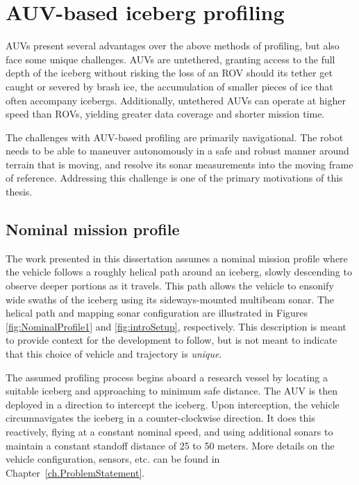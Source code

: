 \section{AUV-based iceberg profiling}

AUVs present several advantages over the above methods of profiling, but also face some unique challenges. AUVs are untethered, granting access to the full depth of the iceberg without risking the loss of an ROV should its tether get caught or severed by brash ice, the accumulation of smaller pieces of ice that often accompany icebergs. Additionally, untethered AUVs can operate at higher speed than ROVs, yielding greater data coverage and shorter mission  time. 

The challenges with AUV-based profiling are primarily navigational. The robot needs to be able to maneuver autonomously in a safe and robust manner around terrain that is moving, and resolve its sonar measurements into the moving frame of reference. Addressing this challenge is one of the primary motivations of this thesis.



\subsection{Nominal mission profile}
\label{sec.MissionProfileDef}
The work presented in this dissertation assumes a nominal mission profile where the vehicle follows a roughly helical path around an iceberg, slowly descending to observe deeper portions as it travels. This path allows the vehicle to ensonify wide swaths of the iceberg using its sideways-mounted multibeam sonar. The helical path and mapping sonar configuration are illustrated in Figures \ref{fig:NominalProfile1} and \ref{fig:introSetup}, respectively. This description is meant to provide context for the development to follow, but is not meant to indicate that this choice of vehicle and trajectory is \emph{unique}.  

The assumed profiling process begins aboard a research vessel by locating a suitable iceberg and approaching to minimum safe distance. The AUV is then deployed in a direction to intercept the iceberg. Upon interception, the vehicle circumnavigates the iceberg in a counter-clockwise direction. It does this reactively, flying at a constant nominal speed, and using additional sonars to maintain a constant standoff distance of 25 to 50 meters. More details on the vehicle configuration, sensors, etc. can be found in Chapter~\ref{ch.ProblemStatement}.

